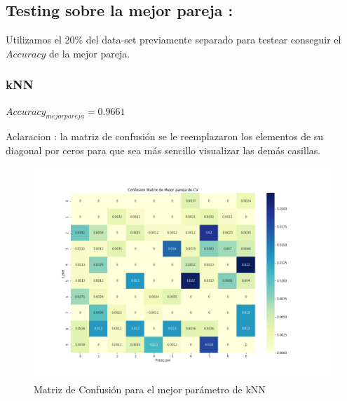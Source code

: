 \subsection{ Testing sobre la mejor pareja : }


Utilizamos el 20$\%$ del data-set previamente separado para testear conseguir el $Accuracy$ de la mejor pareja.

\subsubsection{kNN}

$Accuracy_{mejor pareja} = 0.9661 $
\par
\vspace{0.5cm}
Aclaracion : la matriz de confusión se le reemplazaron los elementos de su diagonal por ceros para que sea más sencillo visualizar las demás casillas.
\begin{figure}[H]
    \centering
    \includegraphics[width=14cm]{images/ConfMatrix_knn.png}%
    \qquad
    \caption{Matriz de Confusión para el mejor parámetro de kNN }
    \label{knn_MatrizConf}%
\end{figure}



